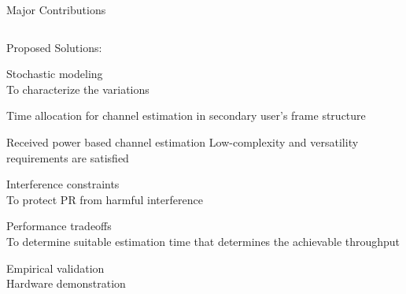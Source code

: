 \documentclass[16pt]{beamer}
\newcommand{\fs}[2]{\fontsize{#1 pt}{#2}\selectfont}
\begin{document}
\begin{frame}[t]{Major Contributions}
\begin{columns}
		\begin{column}[t]{0.44\columnwidth}
			\centering Proposed Solutions: \\[-0.2em]
			\fs{7}{8}
			\begin{block}{}
				\centering
			  	Stochastic modeling \\ To characterize the variations 	
			\end{block}
			\vspace{-0.5mm}
			\begin{block}{}
				\centering
			   	Time allocation for channel estimation in secondary user's frame structure
			\end{block}
			\vspace{-0.5mm}
			\onslide<2->
			{
			\begin{block}{}
				\centering
				Received power based channel estimation
					Low-complexity and versatility requirements are satisfied  
			\end{block}
			}
			\vspace{-0.5mm}
			\onslide<3->
			{
			\begin{block}{}
				\centering
			  	Interference constraints  \\To protect PR from harmful interference 
			\end{block}
			}	
			\vspace{-0.5mm}
			\onslide<3->
			{
			\begin{block}{}
				\centering
			 	Performance tradeoffs \\ To determine suitable estimation time that determines the achievable throughput	
			\end{block}
			}
			\vspace{-0.4mm}
			\onslide<4->
			{
			\begin{block}{}%
				\centering
				Empirical validation \\ Hardware demonstration
			\end{block}
			}
		\end{column}
	\end{columns}
\end{frame}
\end{document}
